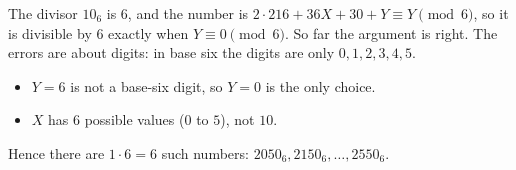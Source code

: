 The divisor $10_6$ is $6$, and the number is $2\cdot216+36X+30+Y\equiv Y\pmod6$, so it is divisible by $6$ exactly when $Y\equiv0\pmod 6$. So far the argument is right. The errors are about digits: in base six the digits are only $0,1,2,3,4,5$.
\begin{itemize}
\item $Y=6$ is not a base-six digit, so $Y=0$ is the only choice.
\item $X$ has $6$ possible values ($0$ to $5$), not $10$.
\end{itemize}
Hence there are $1\cdot6=\boxed{6}$ such numbers: $2050_6,2150_6,\dots,2550_6$.
